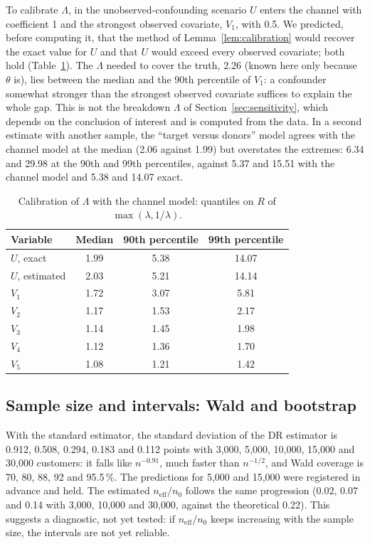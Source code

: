\documentclass[11pt,a4paper]{article}
\newcommand{\neff}{n_{\mathrm{eff}}}
\theoremstyle{plain}
\theoremstyle{definition}
\begin{document}
To calibrate $\Lambda$, in the unobserved-confounding scenario $U$ enters the channel with coefficient 1 and the strongest observed covariate, $V_1$, with 0.5. We predicted, before computing it, that the method of Lemma~\ref{lem:calibration} would recover the exact value for $U$ and that $U$ would exceed every observed covariate; both hold (Table~\ref{tab:calibration}). The $\Lambda$ needed to cover the truth, 2.26 (known here only because $\theta$ is), lies between the median and the 90th percentile of $V_1$: a confounder somewhat stronger than the strongest observed covariate suffices to explain the whole gap. This is not the breakdown $\Lambda$ of Section~\ref{sec:sensitivity}, which depends on the conclusion of interest and is computed from the data. In a second estimate with another sample, the ``target versus donors'' model agrees with the channel model at the median (2.06 against 1.99) but overstates the extremes: 6.34 and 29.98 at the 90th and 99th percentiles, against 5.37 and 15.51 with the channel model and 5.38 and 14.07 exact.

\begin{table}[ht]
\centering\small
\caption{Calibration of $\Lambda$ with the channel model: quantiles on $R$ of $\max(\lambda,1/\lambda)$.}\label{tab:calibration}
\begin{tabular}{@{}lccc@{}}
\toprule
Variable & Median & 90th percentile & 99th percentile \\
\midrule
$U$, exact & 1.99 & 5.38 & 14.07 \\
$U$, estimated & 2.03 & 5.21 & 14.14 \\
$V_1$ & 1.72 & 3.07 & 5.81 \\
$V_2$ & 1.17 & 1.53 & 2.17 \\
$V_3$ & 1.14 & 1.45 & 1.98 \\
$V_4$ & 1.12 & 1.36 & 1.70 \\
$V_5$ & 1.08 & 1.21 & 1.42 \\
\bottomrule
\end{tabular}
\end{table}

\subsection{Sample size and intervals: Wald and bootstrap}\label{sec:res-bootstrap}

With the standard estimator, the standard deviation of the DR estimator is 0.912, 0.508, 0.294, 0.183 and 0.112 points with 3{,}000, 5{,}000, 10{,}000, 15{,}000 and 30{,}000 customers: it falls like $n^{-0.91}$, much faster than $n^{-1/2}$, and Wald coverage is 70, 80, 88, 92 and 95.5\,\%. The predictions for 5{,}000 and 15{,}000 were registered in advance and held. The estimated $\neff/n_0$ follows the same progression (0.02, 0.07 and 0.14 with 3{,}000, 10{,}000 and 30{,}000, against the theoretical 0.22). This suggests a diagnostic, not yet tested: if $\neff/n_0$ keeps increasing with the sample size, the intervals are not yet reliable.
\end{document}
